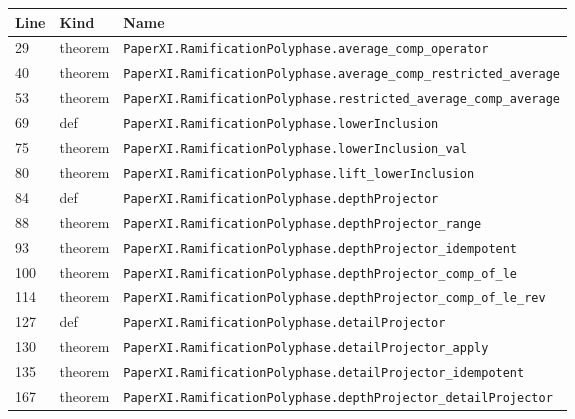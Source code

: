 \documentclass[10pt,oneside]{book}
\begin{document}
\begin{longtable}{@{}p{}p{}p{}@{}}\toprule Line&Kind&Name\\\midrule\endhead

29&theorem&\nolinkurl{PaperXI.RamificationPolyphase.average_comp_operator}\\

40&theorem&\nolinkurl{PaperXI.RamificationPolyphase.average_comp_restricted_average}\\

53&theorem&\nolinkurl{PaperXI.RamificationPolyphase.restricted_average_comp_average}\\

69&def&\nolinkurl{PaperXI.RamificationPolyphase.lowerInclusion}\\

75&theorem&\nolinkurl{PaperXI.RamificationPolyphase.lowerInclusion_val}\\

80&theorem&\nolinkurl{PaperXI.RamificationPolyphase.lift_lowerInclusion}\\

84&def&\nolinkurl{PaperXI.RamificationPolyphase.depthProjector}\\

88&theorem&\nolinkurl{PaperXI.RamificationPolyphase.depthProjector_range}\\

93&theorem&\nolinkurl{PaperXI.RamificationPolyphase.depthProjector_idempotent}\\

100&theorem&\nolinkurl{PaperXI.RamificationPolyphase.depthProjector_comp_of_le}\\

114&theorem&\nolinkurl{PaperXI.RamificationPolyphase.depthProjector_comp_of_le_rev}\\

127&def&\nolinkurl{PaperXI.RamificationPolyphase.detailProjector}\\

130&theorem&\nolinkurl{PaperXI.RamificationPolyphase.detailProjector_apply}\\

135&theorem&\nolinkurl{PaperXI.RamificationPolyphase.detailProjector_idempotent}\\

167&theorem&\nolinkurl{PaperXI.RamificationPolyphase.depthProjector_detailProjector}\\


\end{longtable}
\end{document}
